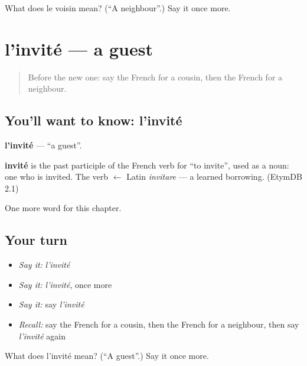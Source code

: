 \begin{tcolorbox}[breakable,colback=teal!4,colframe=teal!35!black,title={Before you move on}]
What does le voisin mean? (\textquotedblleft{}A neighbour\textquotedblright{}.) Say it once more.
\end{tcolorbox}
\section[l'invité]{l'invité — a guest}

\label{lesson:FR-C58-invite}



\begin{quote}
Before the new one: say the French for a cousin, then the French for a neighbour.
\end{quote}

\subsection*{You'll want to know: l'invité}
\textbf{l'invité} — \textquotedblleft{}a guest\textquotedblright{}.

\begin{cousinweb}
\textbf{invité} is the past participle of the French verb for \textquotedblleft{}to invite\textquotedblright{}, used as a noun: one who is invited. The verb $\leftarrow$ Latin \emph{invitare} — a learned borrowing. (EtymDB 2.1)
\end{cousinweb}

\begin{grammarlens}[title={What you've built}]
One more word for this chapter.
\end{grammarlens}

\subsection*{Your turn}
\begin{itemize}
\raggedright
  \item \emph{Say it:} \emph{l'invité}
  \item \emph{Say it:} \emph{l'invité}, once more
  \item \emph{Say it:} say \emph{l'invité}
  \item \emph{Recall:} say the French for a cousin, then the French for a neighbour, then say \emph{l'invité} again
\end{itemize}

\begin{tcolorbox}[breakable,colback=teal!4,colframe=teal!35!black,title={Before you move on}]
What does l'invité mean? (\textquotedblleft{}A guest\textquotedblright{}.) Say it once more.
\end{tcolorbox}

